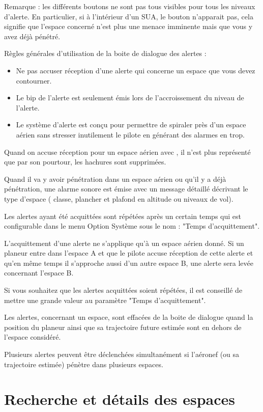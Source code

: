 Remarque : les différents boutons ne sont pas tous visibles pour tous les niveaux d'alerte. En particulier, si à l'intérieur d'un SUA, le bouton   n'apparait pas, cela signifie que l'espace concerné n'est plus une menace imminente mais que vous y avez déjà pénétré.

Règles générales d'utilisation de la boite de dialogue des alertes :
\begin{itemize}
\item  Ne pas accuser réception d'une alerte qui concerne un espace que vous devez contourner.
\item  Le bip de l'alerte est seulement émis lors de l'accroissement du niveau de l'alerte.
\item  Le système d'alerte est conçu pour permettre de spiraler près d'un espace aérien sans stresser inutilement  le pilote en générant des alarmes en trop.
\end{itemize}

Quand on accuse réception pour un espace aérien avec , il n'est plus représenté que par son pourtour, les hachures sont supprimées.

Quand il va y avoir pénétration dans un espace aérien ou qu'il y a déjà pénétration, une alarme sonore est émise avec un message détaillé décrivant le type d'espace ( classe, plancher et plafond en altitude ou niveaux de vol).

Les alertes ayant été acquittées sont répétées après un certain temps qui est configurable dans le menu Option Système sous le nom : "Temps d'acquittement".

L'acquittement d'une alerte ne s'applique qu'à un espace aérien donné. Si un planeur entre dans l'espace A et que le pilote accuse réception de cette alerte et qu'en même temps il s'approche aussi d'un autre espace B, une alerte sera levée concernant l'espace B.

\tip Si vous souhaitez que les alertes acquittées soient répétées, il est conseillé de mettre une grande valeur au paramètre  "Temps d'acquittement".

Les alertes, concernant un espace, sont effacées de la boite de dialogue quand la position du planeur ainsi que sa trajectoire future estimée sont en dehors de l'espace considéré.

Plusieurs alertes peuvent être déclenchées simultanément si l'aéronef (ou sa trajectoire estimée) pénètre dans plusieurs espaces.

\section{Recherche et détails des espaces}\label{sec:airspacedetails}

